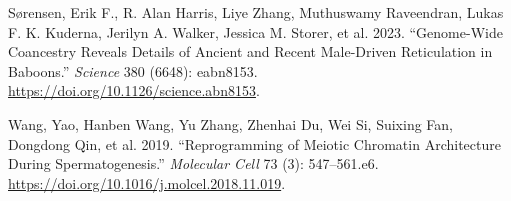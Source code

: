 \documentclass[
  11pt,
  a4paper,
]{scrbook}
\newlength{\cslhangindent}
\newenvironment{CSLReferences}[2] %
 {\begin{list}{}{%
  \setlength{\itemindent}{0pt}
  \setlength{\leftmargin}{0pt}
  \setlength{\parsep}{0pt}
  \ifodd #1
   \setlength{\leftmargin}{\cslhangindent}
   \setlength{\itemindent}{-1\cslhangindent}
  \fi
  \setlength{\itemsep}{#2\baselineskip}}}
 {\end{list}}
\let\oldemph\emph
\renewcommand\emph[1]{\oldemph{\color{gray}#1}}
\begin{document}
\begin{CSLReferences}{1}{0}
Sørensen, Erik F., R. Alan Harris, Liye Zhang, Muthuswamy Raveendran,
Lukas F. K. Kuderna, Jerilyn A. Walker, Jessica M. Storer, et al. 2023.
{``Genome-Wide Coancestry Reveals Details of Ancient and Recent
Male-Driven Reticulation in Baboons.''} \emph{Science} 380 (6648):
eabn8153. \url{https://doi.org/10.1126/science.abn8153}.

Wang, Yao, Hanben Wang, Yu Zhang, Zhenhai Du, Wei Si, Suixing Fan,
Dongdong Qin, et al. 2019. {``Reprogramming of {Meiotic} {Chromatin}
{Architecture} During {Spermatogenesis}.''} \emph{Molecular Cell} 73
(3): 547--561.e6. \url{https://doi.org/10.1016/j.molcel.2018.11.019}.

\end{CSLReferences}

\endgroup


\backmatter
\end{document}
